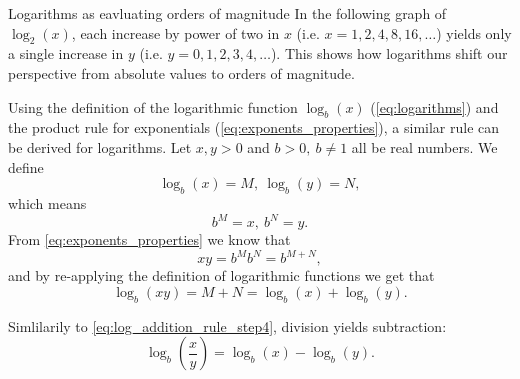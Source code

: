 \begin{example}{Logarithms as eavluating orders of magnitude}{}
	In the following graph of $\log_{2}(x)$, each increase by power of two in $x$ (i.e. $x=1,2,4,8,16,\dots$) yields only a single increase in $y$ (i.e. $y=0,1,2,3,4,\dots$). This shows how logarithms shift our perspective from absolute values to orders of magnitude.
	\begin{figure}[H]
		\centering
	\end{figure}
\end{example}

Using the definition of the logarithmic function $\log_{b}(x)$ (\autoref{eq:logarithms}) and the product rule for exponentials (\autoref{eq:exponents_properties}), a similar rule can be derived for logarithms. Let $x,y>0$ and $b>0,\ b\neq1$ all be real numbers. We define
\begin{equation}
	\log_{b}(x)=M,\ \log_{b}(y)=N,
	\label{eq:log_addition_rule_step1}
\end{equation}
which means
\begin{equation}
	b^{M}=x,\ b^{N}=y.
	\label{eq:log_addition_rule_step2}
\end{equation}
From \autoref{eq:exponents_properties} we know that
\begin{equation}
	xy = b^{M}b^{N} = b^{M+N},
	\label{eq:log_addition_rule_step3}
\end{equation}
and by re-applying the definition of logarithmic functions we get that
\begin{equation}
	\log_{b}(xy) = M+N = \log_{b}(x) + \log_{b}(y).
	\label{eq:log_addition_rule_step4}
\end{equation}

Simlilarily to \autoref{eq:log_addition_rule_step4}, division yields subtraction:
\begin{equation}
	\log_{b}\left(\frac{x}{y}\right) = \log_{b}(x)-\log_{b}(y).
	\label{eq:log_subtraction_rule}
\end{equation}

